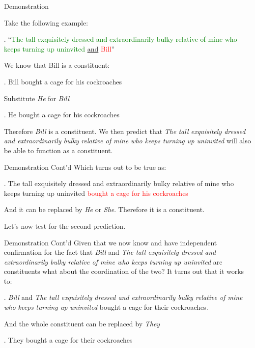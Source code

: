\begin{frame}
{Demonstration}

Take the following example:

\ex.
 ``\textcolor{green}{The tall exquisitely dressed and extraordinarily bulky relative of mine who keeps turning up uninvited} \underline{and} \textcolor{red}{Bill}'' 

We know that Bill is a constituent:

\ex.
Bill bought a cage for his cockroaches

Substitute \textit{He} for \textit{Bill}

\ex.
He bought a cage for his cockroaches


Therefore \textit{Bill} is a constituent.  We then predict that \textit{The tall exquisitely dressed and extraordinarily bulky relative of mine who keeps turning up uninvited} will also be able to function as a constituent.

\end{frame}

\begin{frame}
  {Demonstration Cont'd}
Which turns out to be true as:

\ex.
The tall exquisitely dressed and extraordinarily bulky relative of mine who keeps turning up uninvited \textcolor{red}{bought a cage for his cockroaches}

And it can be replaced by \textit{He} or \textit{She}.  Therefore it is a constituent.  

Let's now test for the second prediction.

\end{frame}

\begin{frame}
  {Demonstration Cont'd}
Given that we now know and have independent confirmation for the fact that \textit{Bill} and \textit{The tall exquisitely dressed and extraordinarily bulky relative of mine who keeps turning up uninvited} are constituents  what about the coordination of the two? It turns out that it works to:

\ex.
\textit{Bill} and \textit{The tall exquisitely dressed and extraordinarily bulky relative of mine who keeps turning up uninvited} bought a cage for their cockroaches.


And the whole constituent can be replaced by \textit{They}

\ex.
They bought a cage for their cockroaches


\end{frame}


